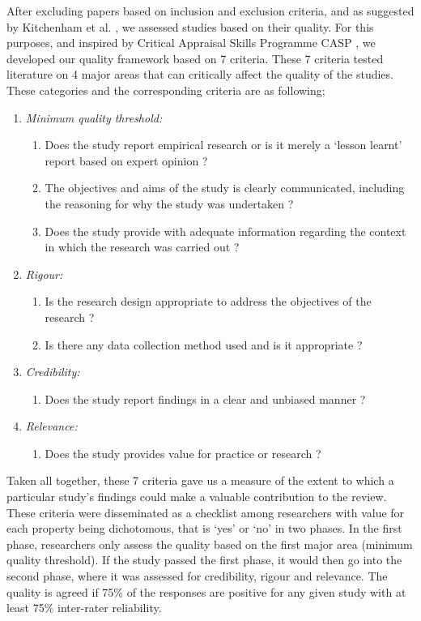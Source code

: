 \documentclass[review]{elsarticle}
\begin{document}
After excluding papers based on inclusion and exclusion criteria, and as suggested by Kitchenham et al. \cite{kitchenham2015evidence}, we assessed studies based on their quality. For this purposes, and inspired by Critical Appraisal Skills Programme CASP \cite{CASP}, we developed our quality framework based on 7 criteria. These 7 criteria tested literature on 4 major areas that can critically affect the quality of the studies. These categories and the corresponding criteria are as following;

\begin{enumerate}
    \item \emph{Minimum quality threshold:} 
    \begin{enumerate}
        \item Does the study report empirical research or is it merely a `lesson learnt' report based on expert opinion ?
        \item The objectives and aims of the study is clearly communicated, including the reasoning for why the study was undertaken ? 
        \item Does the study provide with adequate information regarding the context in which the research was carried out ?
    \end{enumerate}
    \item \emph{Rigour:}
    \begin{enumerate}
        \item Is the research design appropriate to address the objectives of the research ?
        \item Is there any data collection method used and is it appropriate ?
    \end{enumerate}
    \item \emph{Credibility:}
      \begin{enumerate}
        \item Does the study report findings in a clear and unbiased manner ? 
     \end{enumerate}
    \item \emph{Relevance:}
    \begin{enumerate}
        \item Does the study provides value for practice or research ?
     \end{enumerate}
\end{enumerate}

Taken all together, these 7 criteria gave us a measure of the extent to which a particular study's findings could make a valuable contribution to the review. These criteria were disseminated as a checklist among researchers with value for each property being dichotomous, that is `yes’ or `no’ in two
phases. In the first phase, researchers only assess the quality
based on the first major area (minimum quality threshold).
If the study passed the first phase, it would then go into the
second phase, where it was assessed for credibility, rigour
and relevance. The quality is agreed if 75\% of the responses
are positive for any given study with at least 75\% inter-rater
reliability.
\end{document}
